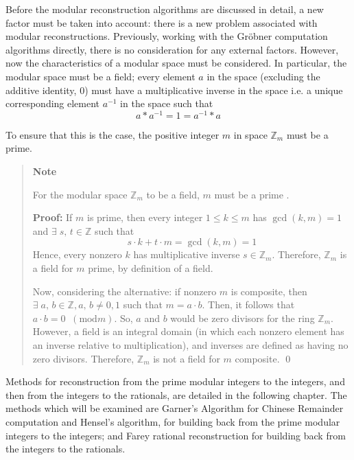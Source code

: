 \documentclass[letterpaper,12pt,titlepage,oneside,final]{book}
\newenvironment{note}{\begin{quote}%
  \textbf{Note }%
  \quad
}{%
\end{quote}%
}
\begin{document}
Before the modular reconstruction algorithms are discussed in detail, a new factor must be taken into account: there is a new problem associated with modular reconstructions.  Previously, working with the Gr\"obner computation algorithms directly, there is no consideration for any external factors.  However, now the characteristics of a modular space must be considered.  In particular, the modular space must be a field; every element ${a}$ in the space (excluding the additive identity, 0) must have a multiplicative inverse in the space i.e. a unique corresponding element ${a^{-1}}$ in the space such that $${a*a^{-1} = 1 = a^{-1}*a}$$  

\noindent To ensure that this is the case, the positive integer ${m}$ in space ${\mathbb{Z}_m}$ must be a prime.
\\

\begin{note}
  For the modular space ${\mathbb{Z}_m}$ to be a field, ${m}$ must be a prime \cite{Durbin}.  

  \textbf{Proof:} If ${m}$ is prime, then every integer ${1 \leq k \leq m}$ has ${\gcd(k, m) = 1}$ and ${\exists \; s, \, t \in \mathbb{Z}}$ such that 
  \begin{equation*}
    s \cdot k + t \cdot m = \gcd(k, m) = 1
  \end{equation*}
  Hence, every nonzero ${k}$ has multiplicative inverse ${s \in \mathbb{Z}_m}$.  Therefore, ${\mathbb{Z}_m}$ is a field for ${m}$ prime, by definition of a field.

  Now, considering the alternative: if nonzero ${m}$ is composite, then ${\exists \; a, \, b \in \mathbb{Z}, a, \, b \neq 0, 1}$ such that ${m = a \cdot b}$.  Then, it follows that ${a \cdot b = 0 \;\;(\textrm{mod} m)}$.  So, ${a}$ and ${b}$ would be zero divisors for the ring ${\mathbb{Z}_m}$.  However, a field is an integral domain (in which each nonzero element has an inverse relative to multiplication), and inverses are defined as having no zero divisors.  Therefore, ${\mathbb{Z}_m}$ is not a field for ${m}$ composite. \qed
\end{note} 

Methods for reconstruction from the prime modular integers to the integers, and then from the integers to the rationals, are detailed in the following chapter.  The methods which will be examined are Garner's Algorithm for Chinese Remainder computation and Hensel's algorithm, for building back from the prime modular integers to the integers; and Farey rational reconstruction for building back from the integers to the rationals.
\end{document}
